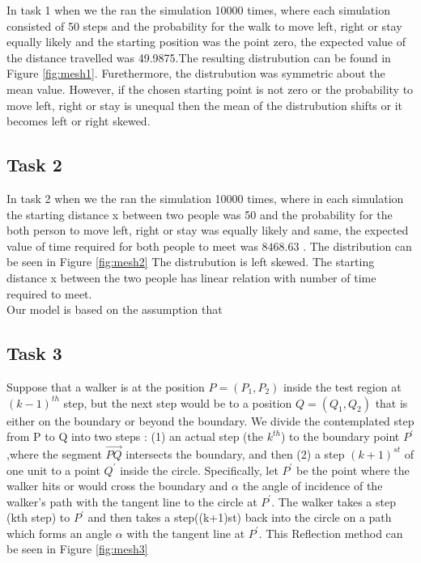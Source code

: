 \documentclass[a4paper, 11pt]{book} %
\begin{document}
In task 1 when we the ran the simulation 10000 times, where each simulation consisted of 50 steps and the probability for the walk to move left, right or stay equally likely and the starting position was the point zero,  the expected value of the distance travelled was 49.9875.The resulting distrubution can be found in Figure \ref{fig:mesh1}.
Furethermore, the distrubution was symmetric about the mean value. However, if the chosen starting point is not zero or the probability to move left, right or stay is unequal then the mean of the distrubution shifts or it becomes left or right skewed.

\subsection*{Task 2}

In task 2 when we the ran the simulation 10000 times, where in each simulation the starting distance x between two people was  50 and the probability for the both person to move left, right or stay was equally likely and same, the expected value of time required for both people to meet was \(8468.63\) . The distribution can be seen in Figure \ref{fig:mesh2}
The distrubution is left skewed. The starting distance x between the two people has linear relation with number of time required to meet. \\
Our model is based on the assumption that 


\subsection*{Task 3}

Suppose that a walker is at the position $P = (P_1,P_2)$ inside the test region at $(k-1)^{th}$ step, but
the next step would be to a position $ Q = (Q_1,Q_2) $ that is either on the boundary or beyond the 
boundary. We divide the contemplated step from P to Q into two steps  : (1) an
actual step (the $k^{th}$) to the boundary point $P^{\prime}$,where the segment $\vec{PQ} $ intersects the boundary,  and then (2)
a step $(k+1)^{st}$ of one unit to a point $Q^{\prime}$ inside the circle. Specifically, let $P^{\prime}$ be the
point where the walker hits or would cross the boundary and $\alpha$ the angle of incidence of the walker's path
with the tangent line to the circle at  $P^{\prime}$. The walker takes a step (kth step) to $P^{\prime}$ and then takes a step((k+1)st) back into the 
circle on a path which forms an angle $\alpha$ with the tangent line at $P^{\prime}$. This Reflection method can be seen in Figure \ref{fig:mesh3}
\end{document}
